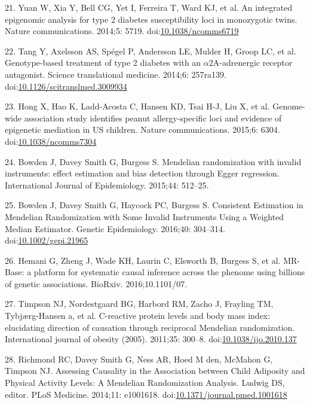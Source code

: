 \documentclass[]{article}
\begin{document}
\hypertarget{ref-Yuan2014}{}
21. Yuan W, Xia Y, Bell CG, Yet I, Ferreira T, Ward KJ, et al. An
integrated epigenomic analysis for type 2 diabetes susceptibility loci
in monozygotic twins. Nature communications. 2014;5: 5719.
doi:\href{https://doi.org/10.1038/ncomms6719}{10.1038/ncomms6719}

\hypertarget{ref-Tang2014}{}
22. Tang Y, Axelsson AS, Spégel P, Andersson LE, Mulder H, Groop LC, et
al. Genotype-based treatment of type 2 diabetes with an
\(\alpha\)2A-adrenergic receptor antagonist. Science translational
medicine. 2014;6: 257ra139.
doi:\href{https://doi.org/10.1126/scitranslmed.3009934}{10.1126/scitranslmed.3009934}

\hypertarget{ref-Hong2015}{}
23. Hong X, Hao K, Ladd-Acosta C, Hansen KD, Tsai H-J, Liu X, et al.
Genome-wide association study identifies peanut allergy-specific loci
and evidence of epigenetic mediation in US children. Nature
communications. 2015;6: 6304.
doi:\href{https://doi.org/10.1038/ncomms7304}{10.1038/ncomms7304}

\hypertarget{ref-Bowden2015}{}
24. Bowden J, Davey Smith G, Burgess S. Mendelian randomization with
invalid instruments: effect estimation and bias detection through Egger
regression. International Journal of Epidemiology. 2015;44: 512--25.

\hypertarget{ref-Bowden2016b}{}
25. Bowden J, Davey Smith G, Haycock PC, Burgess S. Consistent
Estimation in Mendelian Randomization with Some Invalid Instruments
Using a Weighted Median Estimator. Genetic Epidemiology. 2016;40:
304--314.
doi:\href{https://doi.org/10.1002/gepi.21965}{10.1002/gepi.21965}

\hypertarget{ref-Hemani2016}{}
26. Hemani G, Zheng J, Wade KH, Laurin C, Elsworth B, Burgess S, et al.
MR-Base: a platform for systematic causal inference across the phenome
using billions of genetic associations. BioRxiv. 2016;10.1101/07.

\hypertarget{ref-Timpson2011}{}
27. Timpson NJ, Nordestgaard BG, Harbord RM, Zacho J, Frayling TM,
Tybjærg-Hansen a, et al. C-reactive protein levels and body mass index:
elucidating direction of causation through reciprocal Mendelian
randomization. International journal of obesity (2005). 2011;35: 300--8.
doi:\href{https://doi.org/10.1038/ijo.2010.137}{10.1038/ijo.2010.137}

\hypertarget{ref-Richmond2014}{}
28. Richmond RC, Davey Smith G, Ness AR, Hoed M den, McMahon G, Timpson
NJ. Assessing Causality in the Association between Child Adiposity and
Physical Activity Levels: A Mendelian Randomization Analysis. Ludwig DS,
editor. PLoS Medicine. 2014;11: e1001618.
doi:\href{https://doi.org/10.1371/journal.pmed.1001618}{10.1371/journal.pmed.1001618}
\end{document}
